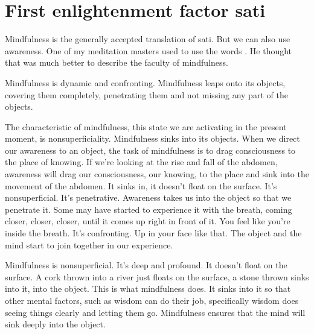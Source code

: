 \documentclass[letterpaper,10pt,english]{sphinxmanual}
\begin{document}
\section{First enlightenment factor sati}
\label{\detokenize{3-b:first-enlightenment-factor-sati}}
\sphinxAtStartPar
{}   Mindfulness is the generally accepted translation of sati. But we can
also  use  awareness.  One  of  my  meditation  masters  used  to  use  the  words
. He thought that was much better to describe the faculty of
mindfulness.

\sphinxAtStartPar
Mindfulness  is  dynamic  and  confronting.  Mindfulness  leaps  onto  its
objects,  covering  them  completely,  penetrating  them  and  not  missing  any
part of the objects.

\sphinxAtStartPar
The  characteristic  of  mindfulness,  this  state  we  are  activating  in  the
present  moment,  is  non\sphinxhyphen{}superficiality.  Mindfulness  sinks  into  its  objects.
When we direct our awareness to an object, the task of mindfulness is to drag
consciousness to the place of knowing. If we’re looking at the rise and fall
of the abdomen, awareness will drag our consciousness, our knowing, to the
place and sink into the movement of the abdomen. It sinks in, it doesn’t float
on the surface. It’s non\sphinxhyphen{}superficial. It’s penetrative. Awareness takes us into
the object so that we penetrate it. Some may have started to experience it
with the breath, coming closer, closer, closer, until it comes up right in front
of it. You feel like you’re inside the breath. It’s confronting. Up in your face
like that. The object and the mind start to join together in our experience.

\sphinxAtStartPar
Mindfulness is non\sphinxhyphen{}superficial. It’s deep and profound. It doesn’t float
on the surface. A cork thrown into a river just floats on the surface, a stone
thrown sinks into it, into the object. This is what mindfulness does. It sinks
into it so that other mental factors, such as wisdom can do their job, specifically wisdom does seeing things clearly and letting them go. Mindfulness
ensures that the mind will sink deeply into the object.
\end{document}
